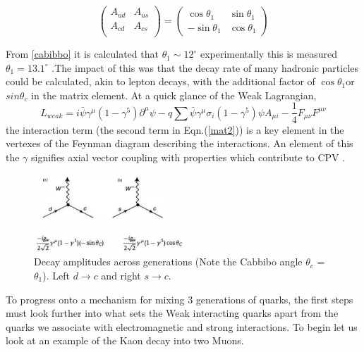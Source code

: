 \begin{equation}\label{mat1}
\left( \begin{array}{ccc} 
A_{ud} & A_{us} \\
A_{cd} & A_{cs}  \\
\end{array} \right)
 = \left( \begin{array}{ccc}
 \cos\theta_{1} & \sin\theta_{1} \\
 -\sin\theta_{1} & \cos\theta_{1} \end{array} \right)\end{equation}

From \cref{cabibbo} it is calculated that $\theta_1\sim 12^{\circ}$ experimentally this is measured $\theta_1 = 13.1^{\circ}$ \cite{CKM9}.The impact of this was that the decay rate of many hadronic particles could be calculated, akin to lepton decays, with the additional factor of $\cos\theta_1$or $sin\theta_c$ in the matrix element. At a quick glance of the Weak Lagrangian,
\begin{equation}\label{mat2}
L_{weak} = i\bar{\psi}\gamma^{\mu}(1-\gamma^{5})\partial^{\mu}\psi -q\sum\bar{\psi}\gamma^{\mu}\sigma_{i}(1-\gamma^{5})\psi A_{\mu i} -\frac{1}{4}F_{\mu \nu}F^{\mu \nu}
\end{equation} 
 the interaction term (the second term in Eqn.(\ref{mat2})) is a key element in the vertexes of the Feynman diagram describing the interactions. An element of this the $\gamma$ signifies axial vector coupling with properties which contribute to CPV \cite{CKM2}.

\begin{figure}[h]
\centering
\includegraphics[width=0.5\textwidth]{figs/ckmfig2.jpg}
\caption{Decay amplitudes across generations (Note the Cabbibo angle $\theta_c$ =$\theta_1$). Left $d\rightarrow c$ and right $s\rightarrow c$.}
\label{fey1}
\end{figure}


To progress onto a mechanism for mixing 3 generations of quarks, the first steps must look further into what sets the Weak interacting quarks apart from the quarks we associate with electromagnetic and strong interactions. To begin let us look at an example of the Kaon decay into two Muons.

